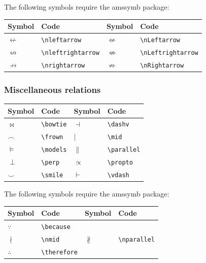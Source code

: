 \documentclass[a4paper,14pt]{extarticle}
\begin{document}
The following symbols require the amssymb package:
\begin{center}
\begin{tabular}{|p{}p{}|p{}p{}|}
\hline
Symbol & Code & Symbol & Code \\
\hline
\(\nleftarrow\) & \verb=\nleftarrow= & \(\nLeftarrow\) & \verb=\nLeftarrow= \\
\(\nleftrightarrow\) & \verb=\nleftrightarrow= & \(\nLeftrightarrow\) & \verb=\nLeftrightarrow= \\
\(\nrightarrow\) & \verb=\nrightarrow= & \(\nRightarrow\) & \verb=\nRightarrow= \\
\hline
\end{tabular}
\end{center}

\subsubsection{Miscellaneous relations}

\begin{center}
\begin{tabular}{|p{}p{}|p{}p{}|}
\hline
Symbol & Code & Symbol & Code \\
\hline
\(\bowtie\) & \verb=\bowtie= & \(\dashv\) & \verb=\dashv= \\
\(\frown\) & \verb=\frown= & \(\mid\) & \verb=\mid= \\
\(\models\) & \verb=\models= &  \(\parallel\) & \verb=\parallel= \\
\(\perp\) & \verb=\perp= & \(\propto\) & \verb=\propto= \\
\(\smile\) & \verb=\smile= & \(\vdash\) & \verb=\vdash= \\
\hline
\end{tabular}
\end{center}

The following symbols require the amssymb package:
\begin{center}
\begin{tabular}{|p{}p{}|p{}p{}|}
\hline
Symbol & Code & Symbol & Code \\
\hline
\(\because\) & \verb=\because= & & \\
\(\nmid\) & \verb=\nmid= & \(\nparallel\) & \verb=\nparallel=\\
\(\therefore\) & \verb=\therefore= && \\
\hline
\end{tabular}
\end{center}
\end{document}
